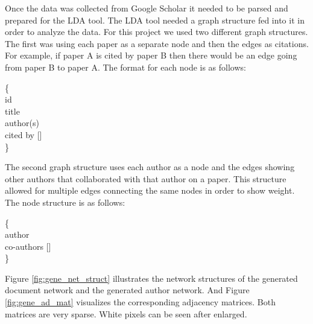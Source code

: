 \documentclass[letterpaper]{article}
\begin{document}
Once the data was collected from Google Scholar it needed to be parsed and prepared for the LDA tool.
The LDA tool needed a graph structure fed into it in order to analyze the data.
For this project we used two different graph structures.
The first was using each paper as a separate node and then the edges as citations.
For example, if paper A is cited by paper B then there would be an edge going from paper B to paper A.
The format for each node is as follows:
\begin{framed}
\noindent
\{\\
\indent\indent id \\
\indent\indent title \\
\indent\indent author(s) \\
\indent\indent cited by []\\
\}
\end{framed}

The second graph structure uses each author as a node and the edges showing other authors that collaborated with that author on a paper.
This structure allowed for multiple edges connecting the same nodes in order to show weight.
The node structure is as follows:
\begin{framed}
\noindent
\{\\
\indent\indent author \\
\indent\indent co-authors [] \\
\}
\end{framed}

Figure \ref{fig:gene_net_struct} illustrates the network structures of the generated document network and the generated author network.
And Figure \ref{fig:gene_ad_mat} visualizes the corresponding adjacency matrices.
Both matrices are very sparse.
White pixels can be seen after enlarged.
\end{document}
